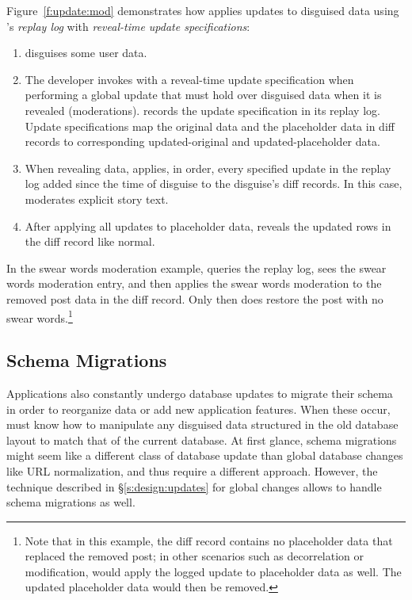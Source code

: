 %
Figure~\ref{f:update:mod} demonstrates how \sys applies updates to
disguised data using \sys's \emph{replay log} with \emph{reveal-time
update specifications}:
\begin{enumerate}[nosep]
    \item[(1)] \sys disguises some user data.
    \item[(2)] The developer invokes \sys with a reveal-time
        update specification when 
performing a global update that must hold over disguised data when it is
        revealed (\eg moderations). \sys records the update specification in its
        replay log. Update specifications map the original data and the
        placeholder data in diff records to corresponding updated-original and
        updated-placeholder data. 
    \item[(3)] When revealing data, \sys applies, in order, every specified
        update in the
        replay log added since the time of disguise to the disguise's diff
        records. In this case, \sys moderates explicit story text.
\item[(4)] After applying all updates to placeholder data, \sys reveals the
    updated rows in the diff record like normal.
\end{enumerate}
%
%
%
In the swear words moderation example, \sys queries the replay log, sees
the swear words moderation entry, and then applies the swear words moderation to
the removed post data in the diff record. Only then does \sys restore the post
with no swear words.\footnote{Note that in this example, the diff
record contains no placeholder data that replaced the removed post; in other
scenarios such as decorrelation or modification, \sys would apply the logged
update to placeholder data as well. The updated placeholder data would then be
removed.}

\subsection{Schema Migrations}
%
Applications also constantly undergo database updates to migrate their schema in
order to reorganize data or add new application features. When these occur, \sys
must know how to manipulate any disguised data structured in the old database
layout to match that of the current database.
%
At first glance, schema migrations might seem like a different class of
database update than global database changes like URL normalization, and
thus require a different approach.
%
However, the technique described in \S\ref{s:design:updates} for global 
changes allows \sys to handle schema migrations as well. 
%

